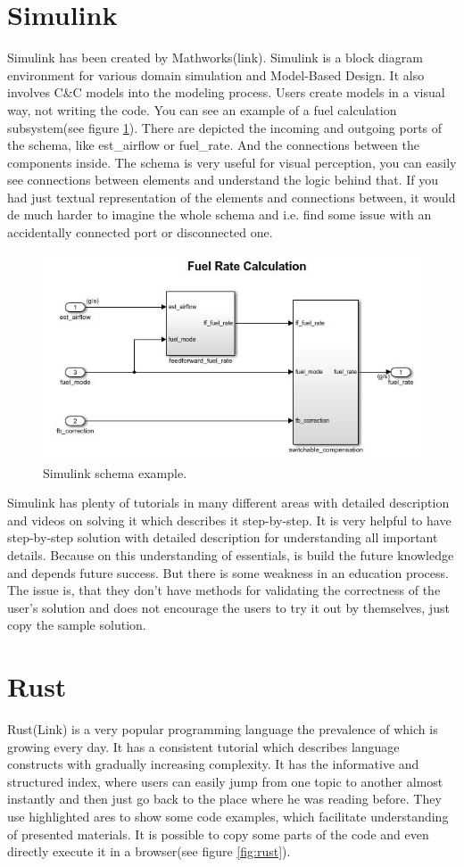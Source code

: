 \section{Simulink}
Simulink has been created by Mathworks(link). Simulink is a block diagram environment for various domain simulation and Model-Based Design. It also involves C\&C models into the modeling process. Users create models in a visual way, not writing the code. You can see an example of a fuel calculation subsystem(see figure \ref{fig:simulink}). There are depicted the incoming and outgoing ports of the schema, like est\_airflow or fuel\_rate. And the connections between the components inside. The schema is very useful for visual perception, you can easily see connections between elements and understand the logic behind that. If you had just textual representation of the elements and connections between, it would de much harder to imagine the whole schema and i.e. find some issue with an accidentally connected port or disconnected one.

\begin{figure}[h!]
    \centering
    \includegraphics[width=0.7\linewidth]{src/pic/simulink}
    \caption{Simulink schema example.}
    \label{fig:simulink}
\end{figure}

Simulink has plenty of tutorials in many different areas with detailed description and videos on solving it which describes it step-by-step. It is very helpful to have step-by-step solution with detailed description for understanding all important details. Because on this understanding of essentials, is build the future knowledge and depends future success. But there is some weakness in an education process. The issue is, that they don't have methods for validating the correctness of the user's solution and does not encourage the users to try it out by themselves, just copy the sample solution.

\section{Rust}
Rust(Link) is a very popular programming language the prevalence of which is growing every day. It has a consistent tutorial which describes language constructs with gradually increasing complexity. It has the informative and structured index, where users can easily jump from one topic to another almost instantly and then just go back to the place where he was reading before. They use highlighted ares to show some code examples, which facilitate understanding of presented materials. It is possible to copy some parts of the code and even directly execute it in a browser(see figure \ref{fig:rust}).


